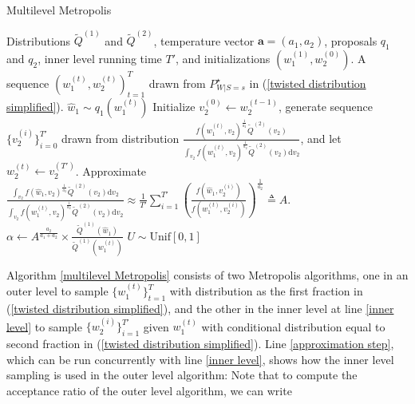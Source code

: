 \documentclass{article}
\begin{document}
\begin{algorithm}
    \caption{Multilevel Metropolis}
    \label{multilevel Metropolis}
    \begin{algorithmic}[1] 
     \Require Distributions $\tilde{Q}^{(1)}$ and $\tilde{Q}^{(2)}$, temperature vector $\mathbf{a}=(a_1,a_2)$, proposals $q_1$ and $q_2$, inner level running time $T'$, and initializations $(w_1^{(1)},w_2^{(0)})$. 
	\Ensure A sequence $(w_1^{(t)},w_2^{(t)})_{t=1}^T$ drawn from $P^{\star}_{W|S=s}$ in (\ref{twisted distribution simplified}).
	\State $\widehat{w}_1\sim q_1\left(w_1^{(t)}\right)$ 
	\State Initialize $v_2^{(0)}\gets w_2^{(t-1)}$, generate sequence $\{v_2^{(i)}\}_{i=0}^{T'}$ drawn from distribution $\frac{f\left(w_1^{(t)},v_2\right)^{\frac{1}{a_2}} \tilde{Q}^{(2)}(v_2)}{\int_{v_2}f\left(w_1^{(t)},v_2\right)^{\frac{1}{a_2}} \tilde{Q}^{(2)}(v_2)\mathrm{d}v_2}$, and let $w_2^{(t)}\gets v_2^{(T')}$. \label{inner level}
	\State Approximate 
$\frac{\int_{v_2}f\left(\widehat{w}_1,v_2\right)^{\frac{1}{a_2}} \tilde{Q}^{(2)}(v_2)\mathrm{d}v_2}{\int_{v_2}f\left(w_1^{(t)},v_2\right)^{\frac{1}{a_2}} \tilde{Q}^{(2)}(v_2)\mathrm{d}v_2}\approx \frac{1}{T'}\sum_{i=1}^{T'}\left(\frac{f\left(\widehat{w}_1,v_2^{(i)}\right)}{f\left(w^{(t)}_1,v_2^{(i)}\right)}\right)^{\frac{1}{a_2}}\triangleq A$. \label{approximation step} 
	\State $\alpha\gets A^{\frac{a_2}{a_1+a_2}}\times\frac{\tilde{Q}^{(1)}\left(\widehat{w}_1\right)}{\tilde{Q}^{(1)}\left(w_1^{(t)}\right)}$
	\State $U\sim \mathrm{Unif}[0,1]$   
	    
	\EndIf 
	\EndFor
   \end{algorithmic}
\end{algorithm}
Algorithm \ref{multilevel Metropolis} consists of two Metropolis algorithms, one in an outer level to sample $\{w_1^{(t)}\}_{t=1}^T$ with distribution as the first fraction in (\ref{twisted distribution simplified}), and the other in the inner level at line \ref{inner level} to sample $\{w_2^{(i)}\}_{i=1}^{T'}$ given $w_1^{(t)}$ with conditional distribution equal to second fraction in (\ref{twisted distribution simplified}). Line \ref{approximation step}, which can be run concurrently with line \ref{inner level},   
shows how the inner level sampling is used in the outer level algorithm: 
Note that to compute the acceptance ratio of the outer level algorithm, we can write 
\end{document}
